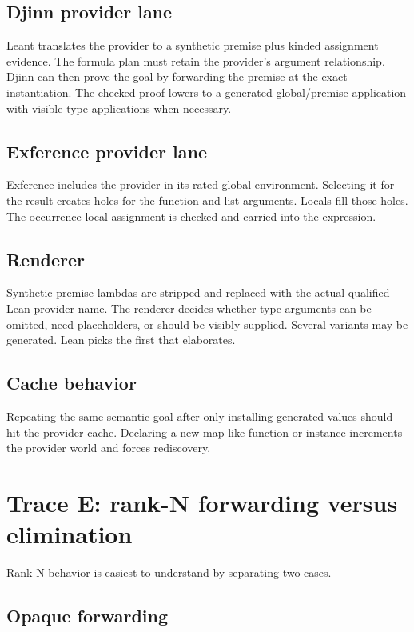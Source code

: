 \documentclass[10pt,letterpaper,oneside]{report}
\newcommand{\code}[1]{\texttt{\detokenize{#1}}}
\begin{document}
\subsection{Djinn provider lane}

Leant translates the provider to a synthetic premise plus kinded assignment evidence. The formula plan must retain the provider's argument relationship. Djinn can then prove the goal by forwarding the premise at the exact instantiation. The checked proof lowers to a generated global/premise application with visible type applications when necessary.

\subsection{Exference provider lane}

Exference includes the provider in its rated global environment. Selecting it for the \code{List b} result creates holes for the function and list arguments. Locals fill those holes. The occurrence-local assignment is checked and carried into the expression.

\subsection{Renderer}

Synthetic premise lambdas are stripped and replaced with the actual qualified Lean provider name. The renderer decides whether type arguments can be omitted, need \code{_} placeholders, or should be visibly supplied. Several variants may be generated. Lean picks the first that elaborates.

\subsection{Cache behavior}

Repeating the same semantic goal after only installing generated \code{it} values should hit the provider cache. Declaring a new map-like function or instance increments the provider world and forces rediscovery.

\section{Trace E: rank-N forwarding versus elimination}\label{sec:trace-rankn}

Rank-N behavior is easiest to understand by separating two cases.

\subsection{Opaque forwarding}
\end{document}
